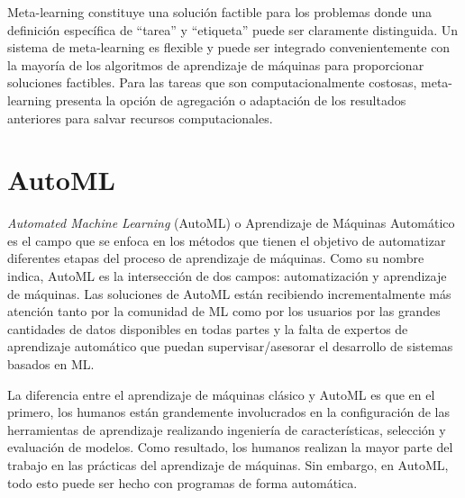 Meta-learning constituye una solución factible para los problemas donde una definición específica de ``tarea'' y ``etiqueta'' puede ser claramente distinguida. Un sistema de meta-learning es flexible y puede ser integrado convenientemente con la mayoría de los algoritmos de aprendizaje de máquinas para proporcionar soluciones factibles. Para las tareas que son computacionalmente costosas, meta-learning presenta la opción de agregación o adaptación de los resultados anteriores para salvar recursos computacionales.
 
\section{AutoML}\label{sec:automl}




\textit{Automated Machine Learning} (AutoML) o Aprendizaje de Máquinas Automático es el campo que se enfoca en los métodos que tienen el objetivo de automatizar diferentes etapas del proceso de aprendizaje de máquinas. Como su nombre indica, AutoML es la intersección de dos campos: automatización y aprendizaje de máquinas. Las soluciones de AutoML están recibiendo incrementalmente más atención tanto por la comunidad de ML como por los usuarios por las grandes cantidades de datos disponibles en todas partes y la falta de expertos de aprendizaje automático que puedan supervisar/asesorar el desarrollo de sistemas basados en ML.

La diferencia entre el aprendizaje de máquinas clásico y AutoML es que en el primero, los humanos están grandemente involucrados en la configuración de las herramientas de aprendizaje realizando ingeniería de características, selección y evaluación de modelos. Como resultado, los humanos realizan la mayor parte del trabajo en las prácticas del aprendizaje de máquinas. Sin embargo, en AutoML, todo esto puede ser hecho con programas de forma automática.

